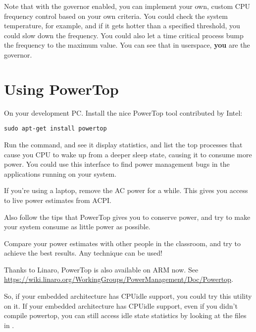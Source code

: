 Note that with the  governor enabled, you can implement
your own, custom CPU frequency control based on your own criteria. You
could check the system temperature, for example, and if it gets hotter
than a specified threshold, you could slow down the frequency. You
could also let a time critical process bump the frequency to the
maximum value. You can see that in userspace, {\bf you} are the
governor.

\section{Using PowerTop}

On your development PC. Install the nice PowerTop tool contributed by Intel:

\begin{verbatim}
sudo apt-get install powertop
\end{verbatim}

Run the  command, and see it display statistics, and
list the top processes that cause you CPU to wake up from a deeper
sleep state, causing it to consume more power. You could use this
interface to find power management bugs in the applications running on
your system.

If you're using a laptop, remove the AC power for a while. This gives
you access to live power estimates from ACPI.

Also follow the tips that PowerTop gives you to conserve power, and
try to make your system consume as little power as possible.

Compare your power estimates with other people in the classroom, and
try to achieve the best results. Any technique can be used!

Thanks to Linaro, PowerTop is also available on ARM now. See
\url{https://wiki.linaro.org/WorkingGroups/PowerManagement/Doc/Powertop}.

So, if your embedded architecture has CPUidle support, you could try
this utility on it. If your embedded architecture has CPUidle support,
even if you didn't compile powertop, you can still access idle state
statistics by looking at the files
in .
